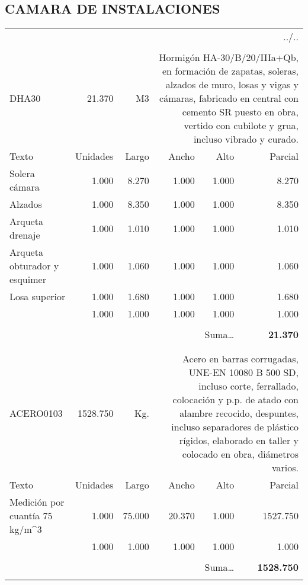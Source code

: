 \documentclass{book}%
\begin{document}
\subsection{CAMARA DE INSTALACIONES}%
\label{subsec:CAMARADEINSTALACIONES}%
\begin{longtable}{lrrrrr}%
\multicolumn{6}{r}{../..}\\%
\endfoot%
\endlastfoot%
&&&&&\\%
DHA30&21.370& M3&\multicolumn{3}{p{6cm}}{\scriptsize Hormigón HA-30/B/20/IIIa+Qb, en formación de zapatas, soleras, alzados de muro, losas y vigas y cámaras, fabricado en central con cemento SR puesto en obra, vertido con cubilote y grua, incluso vibrado y curado.\normalsize}\\%
Texto&Unidades&Largo&Ancho&Alto&Parcial\\%
\hline%
\multicolumn{1}{p{3.5cm}}{Solera cámara}&1.000&8.270&1.000&1.000&8.270\\%
\multicolumn{1}{p{3.5cm}}{Alzados}&1.000&8.350&1.000&1.000&8.350\\%
\multicolumn{1}{p{3.5cm}}{Arqueta drenaje}&1.000&1.010&1.000&1.000&1.010\\%
\multicolumn{1}{p{3.5cm}}{Arqueta obturador y esquimer}&1.000&1.060&1.000&1.000&1.060\\%
\multicolumn{1}{p{3.5cm}}{Losa superior}&1.000&1.680&1.000&1.000&1.680\\%
\multicolumn{1}{p{3.5cm}}{}&1.000&1.000&1.000&1.000&1.000\\%
&&&&&\\%
\multicolumn{5}{r}{Suma\ldots}&\textbf{21.370}\\%
\hline%
&&&&&\\%
&&&&&\\%
ACERO0103&1528.750& Kg.&\multicolumn{3}{p{6cm}}{\scriptsize Acero en barras corrugadas, UNE-EN 10080 B 500 SD, incluso corte, ferrallado, colocación y p.p. de atado con alambre recocido, despuntes, incluso separadores de plástico rígidos, elaborado en taller y colocado en obra, diámetros varios.\normalsize}\\%
Texto&Unidades&Largo&Ancho&Alto&Parcial\\%
\hline%
\multicolumn{1}{p{3.5cm}}{Medición por cuantía 75 kg/m\^{}3}&1.000&75.000&20.370&1.000&1527.750\\%
\multicolumn{1}{p{3.5cm}}{}&1.000&1.000&1.000&1.000&1.000\\%
&&&&&\\%
\multicolumn{5}{r}{Suma\ldots}&\textbf{1528.750}\\%
\hline%
&&&&&\\%
\end{longtable}%
\newpage
\end{document}
